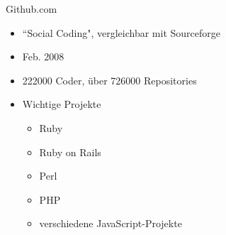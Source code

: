 \documentclass{beamer}
\begin{document}
\begin{frame}[<+->]{Github.com}
\begin{itemize}
    \item ``Social Coding", vergleichbar mit Sourceforge
	\item Feb. 2008
	\item 222000 Coder, über 726000 Repositories
	\item Wichtige Projekte
	\begin{itemize}
	  \item Ruby
	  \item Ruby on Rails
	  \item Perl
	  \item PHP
	  \item verschiedene JavaScript-Projekte
	\end{itemize}
  \end{itemize}
\end{frame}
\end{document}
